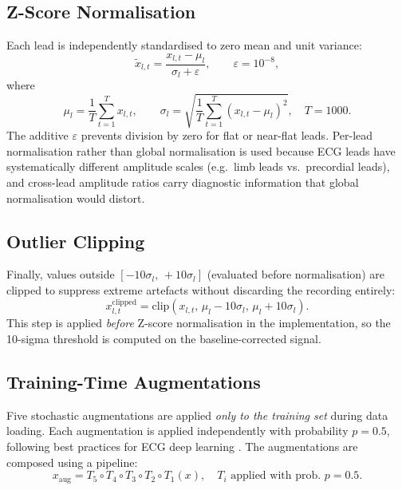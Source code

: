 \subsection{Z-Score Normalisation}

Each lead is independently standardised to zero mean and unit variance:
\begin{equation}
  \tilde{x}_{l,t} =
    \frac{x_{l,t} - \mu_l}{\sigma_l + \varepsilon},
  \qquad \varepsilon = 10^{-8},
  \label{eq:zscore}
\end{equation}
where
\begin{equation}
  \mu_l = \frac{1}{T}\sum_{t=1}^{T} x_{l,t},
  \qquad
  \sigma_l = \sqrt{\frac{1}{T}\sum_{t=1}^{T}(x_{l,t} - \mu_l)^2},
  \quad T = 1000.
  \label{eq:zscore_stats}
\end{equation}
The additive $\varepsilon$ prevents division by zero for flat or
near-flat leads.
Per-lead normalisation rather than global normalisation is used because
ECG leads have systematically different amplitude scales (e.g.\ limb
leads vs.\ precordial leads), and cross-lead amplitude ratios carry
diagnostic information that global normalisation would distort.

\subsection{Outlier Clipping}

Finally, values outside $[-10\sigma_l,\, +10\sigma_l]$ (evaluated before
normalisation) are clipped to suppress extreme artefacts without
discarding the recording entirely:
\begin{equation}
  x_{l,t}^{\mathrm{clipped}} = \mathrm{clip}(x_{l,t},\,
    \mu_l - 10\sigma_l,\, \mu_l + 10\sigma_l).
  \label{eq:clip}
\end{equation}
This step is applied \emph{before} Z-score normalisation in the
implementation, so the 10-sigma threshold is computed on the
baseline-corrected signal.

\subsection{Training-Time Augmentations}

Five stochastic augmentations are applied \emph{only to the training set}
during data loading.
Each augmentation is applied independently with probability $p = 0.5$,
following best practices for ECG deep learning \cite{ref7,ref16}.
The augmentations are composed using a pipeline:
\begin{equation}
  x_{\mathrm{aug}} = T_5 \circ T_4 \circ T_3 \circ T_2 \circ T_1 (x),
  \quad T_i \text{ applied with prob.\ } p = 0.5.
  \label{eq:augpipeline}
\end{equation}

